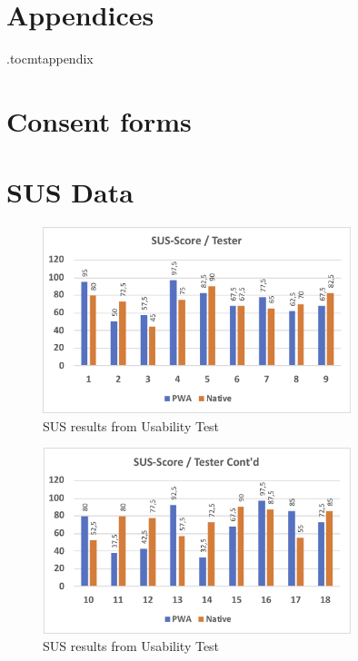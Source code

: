\newpage
\section*{Appendices}
\appendix
\newpage
\etocdepthtag.toc{mtappendix}
\tableofcontents
\newpage


\section{Consent forms}
\label{appendix:consent_forms}



\section{SUS Data}
\label{appendix:a}
\begin{figure}[ht]
	\centering 
    \includegraphics[width=0.8\textwidth]{img/SUS-Score_Bilaga1.png}
	\hfill
	\caption{\label{fig:SUS-Result1}{SUS results from Usability Test}}
\end{figure}
\begin{figure}[ht]
	\centering 
    \includegraphics[width=0.8\textwidth]{img/SUS-Score_Bilaga2.png}
	\hfill
	\caption{\label{fig:SUS-Result2}{SUS results from Usability Test}}
\end{figure}
\newpage

